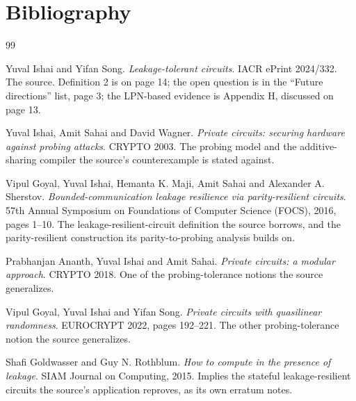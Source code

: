 \documentclass{aicr-conjecture}
\begin{document}
\section{Bibliography}

\begin{aicrbibliography}{99}

Yuval Ishai and Yifan Song.
\emph{Leakage-tolerant circuits}.
IACR ePrint 2024/332.
The source. Definition 2 is on page 14; the open question is in the
``Future directions'' list, page 3; the LPN-based evidence is
Appendix H, discussed on page 13.

Yuval Ishai, Amit Sahai and David Wagner.
\emph{Private circuits: securing hardware against probing attacks}.
CRYPTO 2003.
The probing model and the additive-sharing compiler the source's
counterexample is stated against.

Vipul Goyal, Yuval Ishai, Hemanta K. Maji, Amit Sahai and Alexander A.
Sherstov.
\emph{Bounded-communication leakage resilience via parity-resilient
circuits}.
57th Annual Symposium on Foundations of Computer Science (FOCS), 2016,
pages 1--10.
The leakage-resilient-circuit definition the source borrows, and the
parity-resilient construction its parity-to-probing analysis builds on.

Prabhanjan Ananth, Yuval Ishai and Amit Sahai.
\emph{Private circuits: a modular approach}.
CRYPTO 2018.
One of the probing-tolerance notions the source generalizes.

Vipul Goyal, Yuval Ishai and Yifan Song.
\emph{Private circuits with quasilinear randomness}.
EUROCRYPT 2022, pages 192--221.
The other probing-tolerance notion the source generalizes.

Shafi Goldwasser and Guy N. Rothblum.
\emph{How to compute in the presence of leakage}.
SIAM Journal on Computing, 2015.
Implies the stateful leakage-resilient circuits the source's application
reproves, as its own erratum notes.

\end{aicrbibliography}
\end{document}
